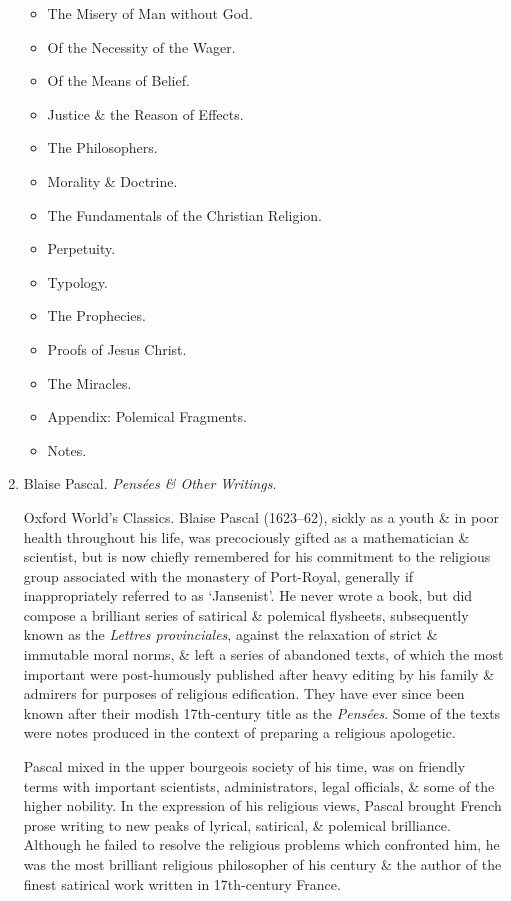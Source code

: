 \documentclass{article}
\begin{document}
\begin{enumerate}
\begin{itemize}
		\item {\sf The Misery of Man without God.}
		\item {\sf Of the Necessity of the Wager.}
		\item {\sf Of the Means of Belief.}
		\item {\sf Justice \& the Reason of Effects.}
		\item {\sf The Philosophers.}
		\item {\sf Morality \& Doctrine.}
		\item {\sf The Fundamentals of the Christian Religion.}
		\item {\sf Perpetuity.}
		\item {\sf Typology.}
		\item {\sf The Prophecies.}
		\item {\sf Proofs of Jesus Christ.}
		\item {\sf The Miracles.}
		\item {\sf Appendix: Polemical Fragments.}
		\item {\sf Notes.}
	\end{itemize}
	
	
	\item {\sc Blaise Pascal}. {\it Pens\'ees \& Other Writings}.
	
	{\sf Oxford World's Classics.} {\sc Blaise Pascal} (1623--62), sickly as a youth \& in poor health throughout his life, was precociously gifted as a mathematician \& scientist, but is now chiefly remembered for his commitment to the religious group associated with the monastery of Port-Royal, generally if inappropriately referred to as `Jansenist'. He never wrote a book, but did compose a brilliant series of satirical \& polemical flysheets, subsequently known as the {\it Lettres provinciales}, against the relaxation of strict \& immutable moral norms, \& left a series of abandoned texts, of which the most important were post-humously published after heavy editing by his family \& admirers for purposes of religious edification. They have ever since been known after their modish 17th-century title as the {\it Pens\'ees}. Some of the texts were notes produced in the context of preparing a religious apologetic.
	
	{\sc Pascal} mixed in the upper bourgeois society of his time, was on friendly terms with important scientists, administrators, legal officials, \& some of the higher nobility. In the expression of his religious views, {\sc Pascal} brought French prose writing to new peaks of lyrical, satirical, \& polemical brilliance. Although he failed to resolve the religious problems which confronted him, he was the most brilliant religious philosopher of his century \& the author of the finest satirical work written in 17th-century France.
	

\end{enumerate}
\end{document}
